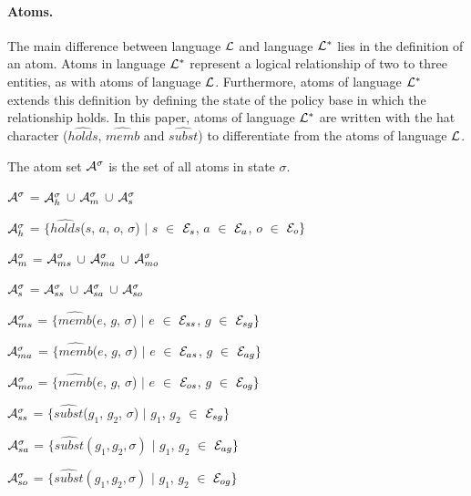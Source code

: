 \documentclass[glov2,twocolumn,final]{svjour2}
\newenvironment{vquote}
  {\begin{list}{}{\leftmargin 1em}\item[]}
  {\end{list}}
\begin{document}
        \paragraph{Atoms.}

          The main difference between language ${\cal L}$ and language
          ${\cal L}^{*}$ lies in the definition of an atom. Atoms in language
          ${\cal L}^{*}$ represent a logical relationship of two to three
          entities, as with atoms of language ${\cal L}$. Furthermore, atoms of
          language ${\cal L}^{*}$ extends this definition by defining the
          state of the policy base in which the relationship holds. In this
          paper, atoms of language ${\cal L}^{*}$ are written with the
          hat character ($\hat{holds}$, $\hat{memb}$ and $\hat{subst}$) to
          differentiate from the atoms of language ${\cal L}$.

          The atom set ${\cal A}^{\sigma}$ is the set of all atoms in state
          $\sigma$.

          \begin{vquote}
            ${\cal A}^{\sigma}$ =
            ${\cal A}^{\sigma}_{h}$ $\cup$ ${\cal A}^{\sigma}_{m}$ $\cup$
            ${\cal A}^{\sigma}_{s}$

            ${\cal A}^{\sigma}_{h}$ =
            $\{\hat{holds}$($s$, $a$, $o$, $\sigma$) $\mid$ $s$ $\in$
            ${\cal E}_{s}$, $a$ $\in$ ${\cal E}_{a}$, $o$ $\in$
            ${\cal E}_{o}\}$

            ${\cal A}^{\sigma}_{m}$ =
            ${\cal A}^{\sigma}_{ms}$ $\cup$ ${\cal A}^{\sigma}_{ma}$ $\cup$
            ${\cal A}^{\sigma}_{mo}$

            ${\cal A}^{\sigma}_{s}$ =
            ${\cal A}^{\sigma}_{ss}$ $\cup$ ${\cal A}^{\sigma}_{sa}$ $\cup$
            ${\cal A}^{\sigma}_{so}$

            ${\cal A}^{\sigma}_{ms}$ =
            $\{\hat{memb}$($e$, $g$, $\sigma$) $\mid$ $e$ $\in$
            ${\cal E}_{ss}$, $g$ $\in$ ${\cal E}_{sg}\}$

            ${\cal A}^{\sigma}_{ma}$ =
            $\{\hat{memb}$($e$, $g$, $\sigma$) $\mid$ $e$ $\in$
            ${\cal E}_{as}$, $g$ $\in$ ${\cal E}_{ag}\}$

            ${\cal A}^{\sigma}_{mo}$ =
            $\{\hat{memb}$($e$, $g$, $\sigma$) $\mid$ $e$ $\in$
            ${\cal E}_{os}$, $g$ $\in$ ${\cal E}_{og}\}$

            ${\cal A}^{\sigma}_{ss}$ = $\{\hat{subst}$($g_{1}$, $g_{2}$,
            $\sigma$) $\mid$ $g_{1}$, $g_{2}$ $\in$ ${\cal E}_{sg}\}$

            ${\cal A}^{\sigma}_{sa}$ =
            $\{\hat{subst}(g_{1}, g_{2}, \sigma)$ $\mid$ $g_{1}$, $g_{2}$ $\in$
            ${\cal E}_{ag}\}$

            ${\cal A}^{\sigma}_{so}$ =
            $\{\hat{subst}(g_{1}, g_{2}, \sigma)$ $\mid$ $g_{1}$, $g_{2}$ $\in$
            ${\cal E}_{og}\}$
          \end{vquote}
\end{document}
